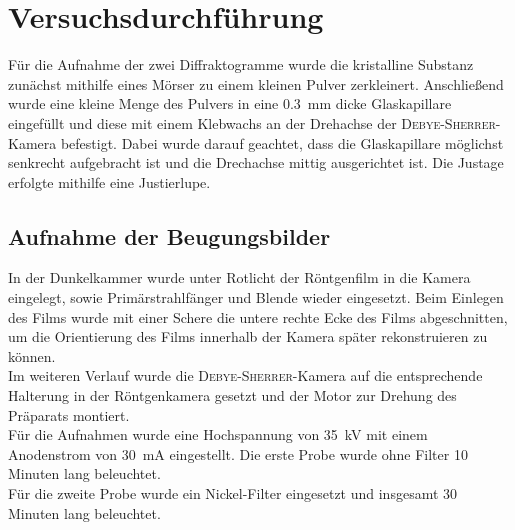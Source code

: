 \documentclass[a4paper,twoside,final]{article}
\begin{document}


\section{Versuchsdurchführung} \label{sec:Versuchsdurchführung}
Für die Aufnahme der zwei Diffraktogramme wurde die kristalline Substanz zunächst mithilfe eines Mörser zu einem kleinen Pulver zerkleinert. Anschließend wurde eine kleine Menge des Pulvers in eine \SI{0.3}{\milli\metre} dicke Glaskapillare eingefüllt und diese mit einem Klebwachs an der Drehachse der \textsc{Debye\--Sherrer}\--Kamera befestigt. Dabei wurde darauf geachtet, dass die Glaskapillare möglichst senkrecht aufgebracht ist und die Drechachse mittig ausgerichtet ist. Die Justage erfolgte mithilfe eine Justierlupe.
\subsection{Aufnahme der Beugungsbilder}
In der Dunkelkammer wurde unter Rotlicht der Röntgenfilm in die Kamera eingelegt, sowie Primärstrahlfänger und Blende wieder eingesetzt. Beim Einlegen des Films wurde mit einer Schere die untere rechte Ecke des Films abgeschnitten, um die Orientierung des Films innerhalb der Kamera später rekonstruieren zu können.\\
Im weiteren Verlauf wurde die \textsc{Debye\--Sherrer}\--Kamera auf die entsprechende Halterung in der Röntgenkamera gesetzt und der Motor zur Drehung des Präparats montiert.\\
Für die Aufnahmen wurde eine Hochspannung von \SI{35}{\kilo\volt} mit einem Anodenstrom von \SI{30}{\milli\ampere} eingestellt. Die erste Probe wurde ohne Filter 10 Minuten lang beleuchtet.\\
Für die zweite Probe wurde ein Nickel-Filter eingesetzt und insgesamt 30 Minuten lang beleuchtet.
\end{document}
